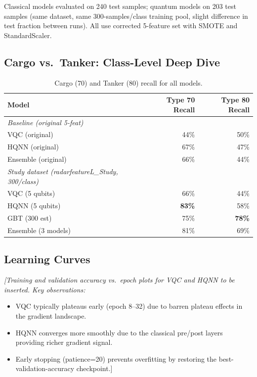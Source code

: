 \documentclass[journal]{IEEEtran}
\begin{document}
\noindent Classical models evaluated on 240 test samples; quantum models on 203
test samples (same dataset, same 300-samples/class training pool, slight
difference in test fraction between runs). All use corrected 5-feature set
with SMOTE and StandardScaler.

\subsection{Cargo vs.\ Tanker: Class-Level Deep Dive}

\begin{table}[H]
\centering
\caption{Cargo (70) and Tanker (80) recall for all models.}
\begin{tabular}{lrr}
\toprule
\textbf{Model} & \textbf{Type 70 Recall} & \textbf{Type 80 Recall} \\
\midrule
\textit{Baseline (original 5-feat)} & & \\
VQC (original)    & 44\% & 50\% \\
HQNN (original)   & 67\% & 47\% \\
Ensemble (original) & 66\% & 44\% \\
\midrule
\textit{Study dataset (radarfeatureL\_Study, 300/class)} & & \\
VQC  (5 qubits)   & 66\% & 44\% \\
HQNN (5 qubits)   & \textbf{83\%} & 58\% \\
GBT  (300 est)    & 75\% & \textbf{78\%} \\
Ensemble (3 models) & 81\% & 69\% \\
\bottomrule
\end{tabular}
\end{table}

\subsection{Learning Curves}

\textit{[Training and validation accuracy vs.\ epoch plots for VQC and HQNN
to be inserted. Key observations:}
\begin{itemize}
  \item VQC typically plateaus early (epoch 8--32) due to barren plateau effects
        in the gradient landscape.
  \item HQNN converges more smoothly due to the classical pre/post layers
        providing richer gradient signal.
  \item Early stopping (patience=20) prevents overfitting by restoring the
        best-validation-accuracy checkpoint.]
\end{itemize}
\end{document}
